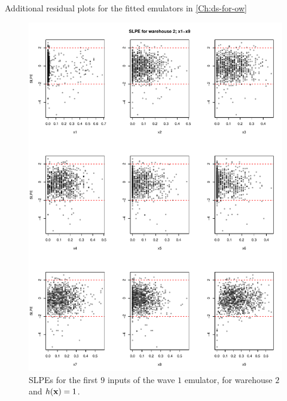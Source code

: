 \begin{chapter}{Additional residual plots  for the fitted emulators in \cref{Ch:ds-for-ow} \label{App:resid}}
\begin{figure}
  \includegraphics[width=\textwidth]{fig-app-ds/w1-w2-1.pdf}
  \caption{SLPEs for the first $9$ inputs of the wave $1$ emulator, for warehouse $2$ and $h(\mathbf{x}) = 1$.}
\end{figure}


\end{chapter}
